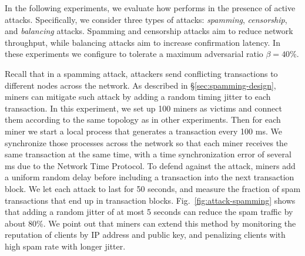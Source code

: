 In the following experiments, we evaluate how \prism performs in the presence of active attacks. Specifically, we consider three  types of attacks: {\em spamming}, \textit{censorship}, and \textit{balancing} attacks. Spamming and censorship attacks aim to reduce network throughput, while balancing attacks aim to increase confirmation latency. 
In these experiments we configure \prism to tolerate a maximum adversarial ratio $\beta=40\%$. 




\label{sec:spamming-eval}
 Recall that in a spamming attack, attackers send conflicting transactions to different nodes across the network. As described in \S\ref{sec:spamming-design}, miners can mitigate such attack by adding a random timing jitter to each transaction. In this experiment, we set up 100 miners as victims and connect them according to the same topology as in other experiments. Then for each miner we start a local process that generates a transaction every 100 ms. We synchronize those processes across the network so that each miner receives the same transaction at the same time, with a time synchronization error of several ms due to the Network Time Protocol. 
To defend against the attack, miners add a uniform random delay before including a transaction into the next transaction block. We let each attack to last for 50 seconds, and measure the fraction of spam transactions that end up in transaction blocks. 
Fig.~\ref{fig:attack-spamming} shows that adding a random jitter of at most 5 seconds can reduce the spam traffic by about 80\%. 
We point out that miners can extend this method by monitoring the reputation of clients by IP address and public key, and penalizing clients with high spam rate with longer jitter.


